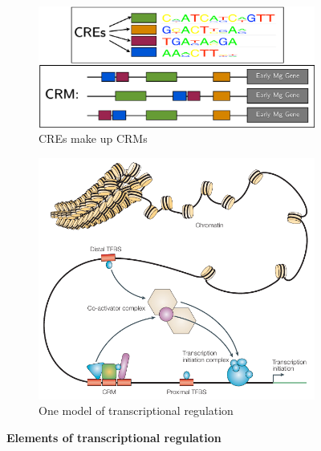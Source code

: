 

\begin{figure}[h]

\begin{subfigure}[b]{.5\linewidth}
\centering 
\includegraphics[width=0.9\linewidth]{figures/figs/CREvCRM.pdf}
\caption{\sf CREs make up CRMs}\label{fig:cre-crm-intro-a}
\end{subfigure}%
\hfil
\begin{subfigure}[b]{.5\linewidth}
\centering
\includegraphics[width=0.9\linewidth]{figures/figs/elementsOfTxReg.pdf}
\caption{\sf One model of transcriptional regulation \CITEME}\label{fig:cre-crm-intro-b}
\end{subfigure}

\caption[Elements of transcriptional regulation]{\sf \textbf{Elements of transcriptional regulation}}\label{fig:cre-crm-intro}
\end{figure}